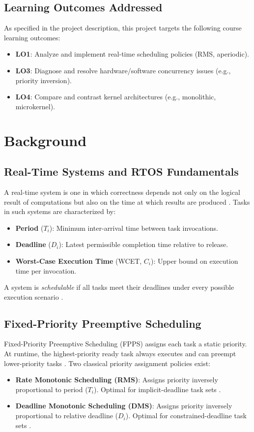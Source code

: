 \documentclass[conference]{IEEEtran}
\begin{document}
\subsection{Learning Outcomes Addressed}
As specified in the project description, this project targets the following course learning outcomes:
\begin{itemize}
  \item \textbf{LO1}: Analyze and implement real-time scheduling policies (RMS, aperiodic).
  \item \textbf{LO3}: Diagnose and resolve hardware/software concurrency issues (e.g., priority inversion).
  \item \textbf{LO4}: Compare and contrast kernel architectures (e.g., monolithic, microkernel).
\end{itemize}

\section{Background}

\subsection{Real-Time Systems and RTOS Fundamentals}
A real-time system is one in which correctness depends not only on the logical result of computations but also on the time at which results are produced \cite{liu2000real}. Tasks in such systems are characterized by:
\begin{itemize}
  \item \textbf{Period} ($T_i$): Minimum inter-arrival time between task invocations.
  \item \textbf{Deadline} ($D_i$): Latest permissible completion time relative to release.
  \item \textbf{Worst-Case Execution Time} (WCET, $C_i$): Upper bound on execution time per invocation.
\end{itemize}
A system is \textit{schedulable} if all tasks meet their deadlines under every possible execution scenario \cite{buttazzo2011hard}.

\subsection{Fixed-Priority Preemptive Scheduling}
Fixed-Priority Preemptive Scheduling (FPPS) assigns each task a static priority. At runtime, the highest-priority ready task always executes and can preempt lower-priority tasks \cite{liu1973scheduling}. Two classical priority assignment policies exist:
\begin{itemize}
  \item \textbf{Rate Monotonic Scheduling (RMS)}: Assigns priority inversely proportional to period ($T_i$). Optimal for implicit-deadline task sets \cite{liu1973scheduling}.
  \item \textbf{Deadline Monotonic Scheduling (DMS)}: Assigns priority inversely proportional to relative deadline ($D_i$). Optimal for constrained-deadline task sets \cite{leung1982complexity}.
\end{itemize}
\end{document}
